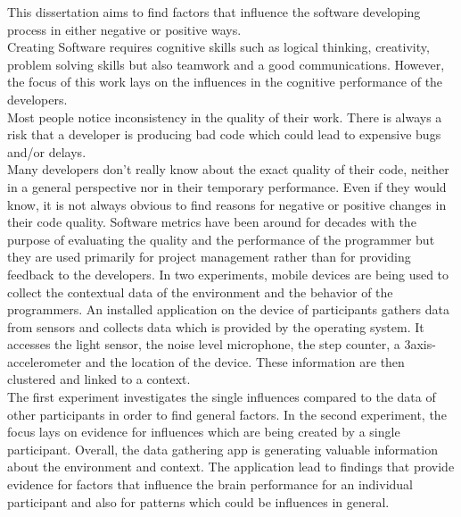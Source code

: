 \documentclass[a4paper, 12pt, oneside]{report}    	%
\begin{document}
\begin{thesisabstract}
%      
This dissertation aims to find factors that influence the software developing process in either negative or positive ways.\\
Creating Software requires cognitive skills such as logical thinking, creativity, problem solving skills but also teamwork and a good communications. 
However, the focus of this work lays on the influences in the cognitive performance of the developers.\\ 
Most people notice inconsistency in the quality of their work. There is always a risk that a developer is producing bad code which could lead to expensive bugs and/or delays.\\
Many developers don't really know about the exact quality of their code, neither in a general perspective nor in their temporary performance. Even if they would know, it is not always obvious to find reasons for negative or positive changes in their code quality.
Software metrics have been around for decades with the purpose of evaluating the quality and the performance of the programmer but they are used primarily for project management rather than for providing feedback to the developers. 
\bigbreak
In two experiments, mobile devices are being used to collect the contextual data of the environment and the behavior of the programmers. 
An installed application on the device of participants gathers data from sensors and collects data which is provided by the operating system. It accesses the light sensor, the noise level microphone, the step counter, a 3axis-accelerometer and the location of the device. These information are then clustered and linked to a context.\\
The first experiment investigates the single influences compared to the data of other participants in order to find general factors. In the second experiment, the focus lays on evidence for influences which are being created by a single participant. 
\bigbreak
Overall, the data gathering app is generating valuable information about the environment and context. 
The application lead to findings that provide evidence for factors that influence the brain performance for an individual participant and also for patterns which could be influences in general. 
\end{thesisabstract}

\tableofcontents 
\listoftables                                     			%
\listoffigures                                    			%
\end{document}
